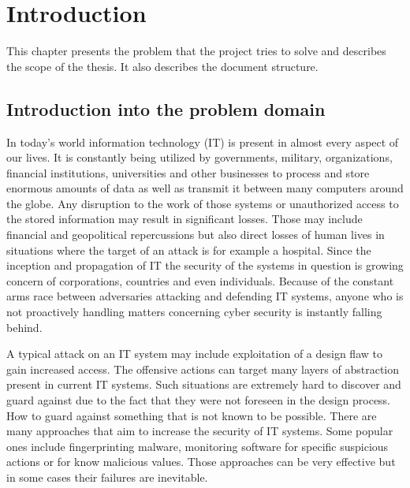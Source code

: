\documentclass[a4paper,twoside,12pt]{book}
\newcounter{PagesWithoutNumbers}
\begin{document}
\vfill
 
 

\cleardoublepage


\pagestyle{onlyPageNumbers}
\tableofcontents

\setcounter{PagesWithoutNumbers}{\value{page}}
\mainmatter
\pagestyle{PageNumbersChapterTitles}


\chapter{Introduction}

This chapter presents the problem that the project tries to solve and describes the scope 
of the thesis. It also describes the document structure.



\section{Introduction into the problem domain}


In today's world information technology (IT) is present in almost every aspect of our lives. 
It is constantly being utilized by governments, military, organizations, financial institutions,
universities and other businesses to process and store enormous amounts of data as well as 
transmit it between many computers around the globe. Any disruption to the work of those 
systems or unauthorized access to the stored information may result in significant losses.
Those may include financial and geopolitical repercussions but also direct losses of human
lives in situations where the target of an attack is for example a hospital. Since the inception
and propagation of IT the security of the systems in question is growing concern of corporations, 
countries and even individuals. Because of the constant arms race between adversaries attacking 
and defending IT systems, anyone who is not proactively handling matters concerning cyber security 
is instantly falling behind. \cite{bib:articleImportanceOfCybersecurity} 

A typical attack on an IT system may include exploitation of a design 
flaw to gain increased access. The offensive actions can target many layers of 
abstraction present in current IT systems. Such situations are extremely hard to discover 
and guard against due to the fact that they were not foreseen in the design process. How to guard 
against something that is not known to be possible. There are many approaches that aim to 
increase the security of IT systems. Some popular ones include fingerprinting malware, 
monitoring software for specific suspicious actions or for know 
malicious values. Those approaches can be very effective but in some cases their 
failures are inevitable.
\end{document}
